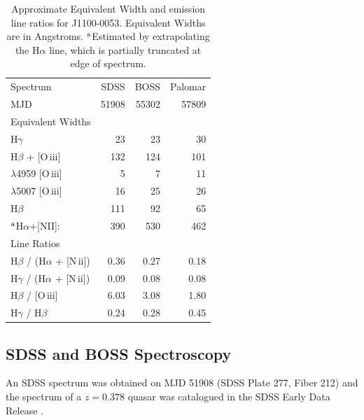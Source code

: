 \documentclass[a4paper,fleqn,usenatbib]{mnras}
\begin{document}
{\bf 
  \begin{table}
    \centering
    \begin{tabular}{l r r r}
      \hline \hline 
       Spectrum                                                        &	SDSS  &	BOSS    &	Palomar\\
      MJD                                                                  &    51908 &  55302  &    57809          \\              
      \hline   
       Equivalent Widths & & & \\   
     H$\gamma$                                                       &    23       &   23    &    30 \\
      H$\beta$ +  [O\,{\sc iii}]                                   &  132       & 124    &  101 \\
        $\lambda$4959 [O\,{\sc iii}]                           &      5       &     7    &   11 \\
         $\lambda$5007 [O\,{\sc iii}]                          &    16      &  25 &     26\\
      H$\beta$                                                           &  111     &   92   &    65\\
     $^{{\rm a}}$H$\alpha$+[NII]:                                 &  390     &  530    &   462\\
      \hline   
      Line Ratios  & & & \\
      H$\beta$      / (H$\alpha$ + [N\,{\sc ii}])   &  0.36    &  0.27   &  0.18 \\
      H$\gamma$ / (H$\alpha$ + [N\,{\sc ii}])   &  0.09    &  0.08   &  0.08 \\
      H$\beta$      / [O\,{\sc iii}]   	                  &  6.03    &  3.08   &  1.80  \\ 
      H$\gamma$ / H$\beta$      	                  &  0.24    &  0.28   &  0.45 \\
      \hline \hline 
  \end{tabular}
      \caption{Approximate Equivalent Width and emission line ratios for J1100-0053.
        Equivalent Widths are in Angstroms. 
        $^{{\rm a}}$Estimated by extrapolating the H$\alpha$ line, which is partially truncated at edge of spectrum.} 
      \label{tab:line_ratios}
\end{table}
}
\subsection{SDSS and BOSS Spectroscopy}
An SDSS spectrum was obtained on MJD 51908 (SDSS Plate 277, Fiber 212) and
the spectrum of a $z=0.378$ quasar was catalogued in the SDSS Early
Data Release \citep{Stoughton2002, Schneider2002}. 
\end{document}
